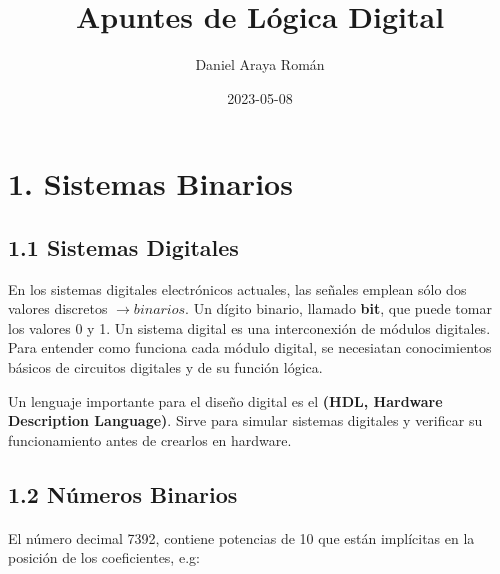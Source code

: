 \title{Apuntes de L\'{o}gica Digital}
\date{2023-05-08}
\author{Daniel Araya Rom\'{a}n}

\maketitle
\newpage

\section*{1. Sistemas Binarios}

\paragraph*{} \normalsize

\subsection*{1.1 Sistemas Digitales}
En los sistemas digitales electr\'{o}nicos actuales, las se\~{n}ales emplean
s\'{o}lo dos valores discretos $\rightarrow binarios$. Un d\'{i}gito binario,
llamado \textbf{bit}, que puede tomar los valores 0 y 1. Un sistema digital es
una interconexi\'{o}n de m\'{o}dulos digitales. Para entender como funciona cada
m\'{o}dulo digital, se necesiatan conocimientos b\'{a}sicos de circuitos
digitales y de su funci\'{o}n l\'{o}gica.

Un lenguaje importante para el dise\~{n}o digital es el \textbf{(HDL, Hardware Description Language)}.
Sirve para simular sistemas digitales y verificar su funcionamiento antes de crearlos en hardware.
\medskip
\begin{center}
\end{center}
\medskip

\subsection*{1.2 N\'{u}meros Binarios}
\paragraph*{}
\normalsize
El n\'{u}mero decimal 7392, contiene potencias de 10 que est\'{a}n
impl\'{i}citas en la posici\'{o}n de los coeficientes, e.g:
\medskip

